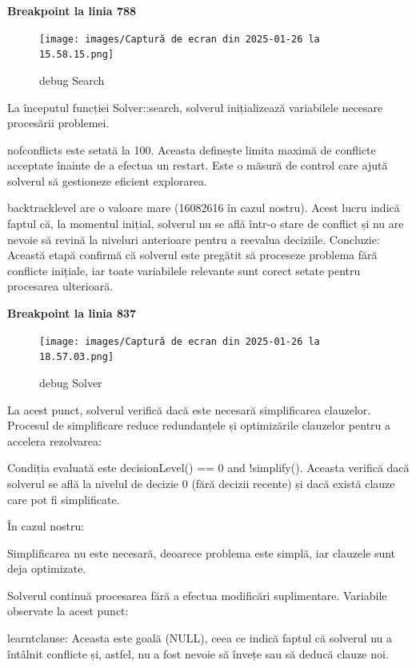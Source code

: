 \documentclass[runningheads]{llncs}
\begin{document}
\textbf{Breakpoint la linia 788}

\begin{figure}
    \centering
    \texttt{[image: images/Captură de ecran din 2025-01-26 la 15.58.15.png]}
    \caption{debug Search}
    \label{fig:2}
\end{figure}

La începutul funcției Solver::search, solverul inițializează variabilele necesare procesării problemei.

nof\underline{}conflicts este setată la 100. Aceasta definește limita maximă de conflicte acceptate înainte de a efectua un restart. Este o măsură de control care ajută solverul să gestioneze eficient explorarea.

backtrack\underline{}level are o valoare mare (16082616 în cazul nostru). Acest lucru indică faptul că, la momentul inițial, solverul nu se află într-o stare de conflict și nu are nevoie să revină la niveluri anterioare pentru a reevalua deciziile.
Concluzie: Această etapă confirmă că solverul este pregătit să proceseze problema fără conflicte inițiale, iar toate variabilele relevante sunt corect setate pentru procesarea ulterioară.

\textbf{Breakpoint la linia 837}

\begin{figure}
    \centering
    \texttt{[image: images/Captură de ecran din 2025-01-26 la 18.57.03.png]}
    \caption{debug Solver}
    \label{fig:2}
\end{figure}

La acest punct, solverul verifică dacă este necesară simplificarea clauzelor. Procesul de simplificare reduce redundanțele și optimizările clauzelor pentru a accelera rezolvarea:

Condiția evaluată este decisionLevel() == 0 and !simplify(). Aceasta verifică dacă solverul se află la nivelul de decizie 0 (fără decizii recente) și dacă există clauze care pot fi simplificate.

În cazul nostru:

Simplificarea nu este necesară, deoarece problema este simplă, iar clauzele sunt deja optimizate.

Solverul continuă procesarea fără a efectua modificări suplimentare.
Variabile observate la acest punct:

learnt\underline{}clause: Aceasta este goală (NULL), ceea ce indică faptul că solverul nu a întâlnit conflicte și, astfel, nu a fost nevoie să învețe sau să deducă clauze noi.
\end{document}
